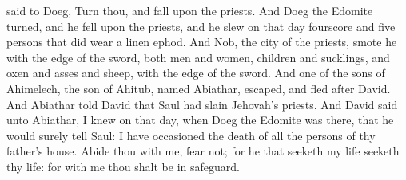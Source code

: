 said to Doeg, Turn thou, and fall upon the priests. And Doeg the Edomite turned, and he fell upon the priests, and he slew on that day fourscore and five persons that did wear a linen ephod. And Nob, the city of the priests, smote he with the edge of the sword, both men and women, children and sucklings, and oxen and asses and sheep, with the edge of the sword.  And one of the sons of Ahimelech, the son of Ahitub, named Abiathar, escaped, and fled after David. And Abiathar told David that Saul had slain Jehovah’s priests. And David said unto Abiathar, I knew on that day, when Doeg the Edomite was there, that he would surely tell Saul: I have occasioned the death of all the persons of thy father’s house. Abide thou with me, fear not; for he that seeketh my life seeketh thy life: for with me thou shalt be in safeguard. 

